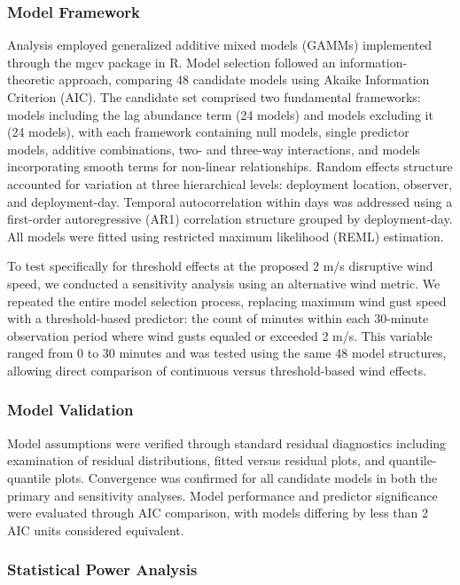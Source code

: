 \subsubsection{Model Framework}

Analysis employed generalized additive mixed models (GAMMs) implemented through the mgcv package in R. Model selection followed an information-theoretic approach, comparing 48 candidate models using Akaike Information Criterion (AIC). The candidate set comprised two fundamental frameworks: models including the lag abundance term (24 models) and models excluding it (24 models), with each framework containing null models, single predictor models, additive combinations, two- and three-way interactions, and models incorporating smooth terms for non-linear relationships. Random effects structure accounted for variation at three hierarchical levels: deployment location, observer, and deployment-day. Temporal autocorrelation within days was addressed using a first-order autoregressive (AR1) correlation structure grouped by deployment-day. All models were fitted using restricted maximum likelihood (REML) estimation.

To test specifically for threshold effects at the proposed 2 m/s disruptive wind speed, we conducted a sensitivity analysis using an alternative wind metric. We repeated the entire model selection process, replacing maximum wind gust speed with a threshold-based predictor: the count of minutes within each 30-minute observation period where wind gusts equaled or exceeded 2 m/s. This variable ranged from 0 to 30 minutes and was tested using the same 48 model structures, allowing direct comparison of continuous versus threshold-based wind effects.

\subsubsection{Model Validation}

Model assumptions were verified through standard residual diagnostics including examination of residual distributions, fitted versus residual plots, and quantile-quantile plots. Convergence was confirmed for all candidate models in both the primary and sensitivity analyses. Model performance and predictor significance were evaluated through AIC comparison, with models differing by less than 2 AIC units considered equivalent.

\subsubsection{Statistical Power Analysis}

